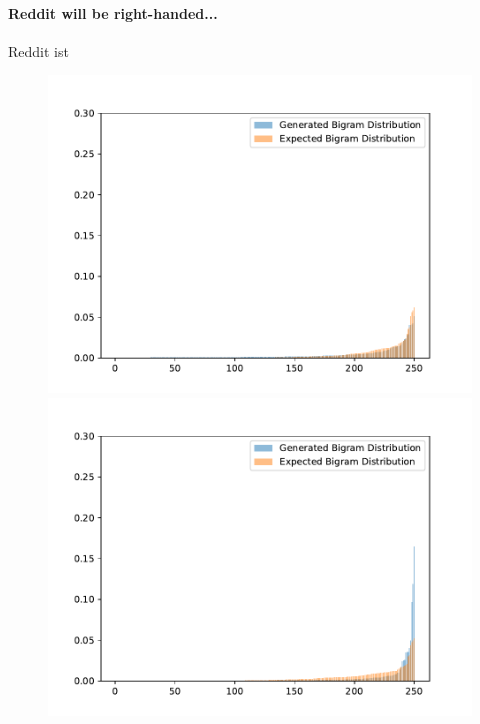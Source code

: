 \paragraph{Reddit will be right-handed...} Reddit ist 
\begin{figure}[H]
	\includegraphics[width=\linewidth]{img/plots/opensubtitles_not_reversed/bigram_distribution_comparison_step_500000.pdf}
	\centering
	\small
	\endminipage\hfill
	\includegraphics[width=\linewidth]{img/plots/opensubtitles_not_reversed/bigram_distribution_comparison_step_1000000.pdf}
	\centering
	\small
	\endminipage\hfill

\end{figure}
